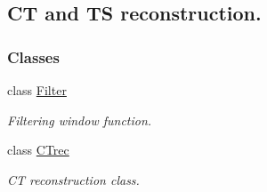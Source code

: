\hypertarget{group__CT}{
\subsection{CT and TS reconstruction.}
\label{group__CT}
}
\subsubsection*{Classes}
\begin{DoxyCompactItemize}
\item 
class \hyperlink{classFilter}{Filter}
\begin{DoxyCompactList}\small\item\em Filtering window function. \item\end{DoxyCompactList}\item 
class \hyperlink{classCTrec}{CTrec}
\begin{DoxyCompactList}\small\item\em CT reconstruction class. \item\end{DoxyCompactList}\end{DoxyCompactItemize}
